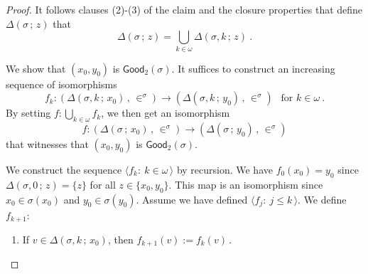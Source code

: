 \documentclass[10pt,a4paper]{amsart}
\begin{document}
\begin{proof}
It follows clauses (2)-(3) of the  claim   and the closure properties that define    $      \Delta \left(  \sigma   \,  ;   \,   z  \right)   $  that 
\[
  \Delta \left(  \sigma   \,  ;   \,   z  \right)    =  \bigcup_{  k  \in  \omega  }      \Delta \left(  \sigma , k  \,  ;   \,   z  \right)   
  \       . 
\]






We show that    $  (x_0,  y_0)  $  is     $  \mathsf{Good}_2  \left(  \sigma \right) $.
It suffices to construct an increasing sequence  of isomorphisms 
\[
f_k  :    \left(   \Delta \left(  \sigma , k  \,  ;   \,   x_0   \right)    \,  ,  \,   \in^{  \sigma }   \right)  
   \to  
   \left(     \Delta \left(  \sigma , k  \,  ;   \,   y_0  \right)       \,  ,  \,   \in^{  \sigma }   \right)  
\     \    \mbox{  for  }  k  \in  \omega 
\     .
\]
By setting  $  f  :   \bigcup_{  k   \in   \omega }    f_k $,  we then get an isomorphism 
\[
f  :    \left(   \Delta \left(  \sigma   \,  ;   \,   x_0   \right)    \,  ,  \,   \in^{  \sigma }   \right)  
   \to  
   \left(     \Delta \left(  \sigma   \,  ;   \,   y_0  \right)       \,  ,  \,   \in^{  \sigma }   \right)  
\]
that witnesses that    $  (x_0,  y_0)  $  is     $  \mathsf{Good}_2  \left(  \sigma \right)  $. 





We construct the sequence    $  \langle f_k  :   \   k  \in  \omega   \,  \rangle  $  by recursion. 
We have  $  f_0  \left(  x_0  \right)   = y_0 $  since 
 $    \Delta \left(  \sigma , 0  \,  ;   \,   z   \right)    =  \lbrace  z  \rbrace  $  for all $  z  \in  \lbrace x_0,  y_0  \rbrace  $. 
This map is an isomorphism since   $  x_0  \in  \sigma \left(  x_0  \right)   $  and    $  y_0  \in   \sigma \left(  y_0  \right)   $.
Assume we have defined  $  \langle f_j  :   \    j  \leq  k    \,  \rangle  $. 
We define  $  f_{ k+1}  $: 
\begin{enumerate}
\item  If   $   v  \in    \Delta \left(  \sigma , k  \,  ;   \,   x_0   \right)    $, then 
$  f_{ k+1}  \left( v  \right)    :=    f_k (v)        \,   $. 




\end{enumerate}
\end{proof}
\end{document}
